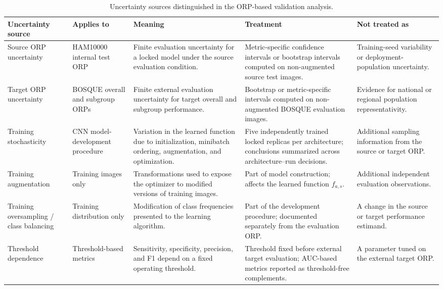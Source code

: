 \begin{table}[h!]
\centering
\scriptsize
\caption{Uncertainty sources distinguished in the ORP-based validation analysis.}
\label{tab:uncertainty-sources}
\setlength{\tabcolsep}{4pt}
\renewcommand{\arraystretch}{1.08}
\begin{tabular}{p{3.0cm}p{3.0cm}p{4.2cm}p{4.2cm}p{3.7cm}}
\toprule
\textbf{Uncertainty source} & \textbf{Applies to} & \textbf{Meaning} & \textbf{Treatment} & \textbf{Not treated as} \\
\midrule
Source ORP uncertainty & HAM10000 internal test ORP & Finite evaluation uncertainty for a locked model under the source evaluation condition. & Metric-specific confidence intervals or bootstrap intervals computed on non-augmented source test images. & Training-seed variability or deployment-population uncertainty. \\
\addlinespace
Target ORP uncertainty & BOSQUE overall and subgroup ORPs & Finite external evaluation uncertainty for target overall and subgroup performance. & Bootstrap or metric-specific intervals computed on non-augmented BOSQUE evaluation images. & Evidence for national or regional population representativity. \\
\addlinespace
Training stochasticity & CNN model-development procedure & Variation in the learned function due to initialization, minibatch ordering, augmentation, and optimization. & Five independently trained locked replicas per architecture; conclusions summarized across architecture--run decisions. & Additional sampling information from the source or target ORP. \\
\addlinespace
Training augmentation & Training images only & Transformations used to expose the optimizer to modified versions of training images. & Part of model construction; affects the learned function $f_{a,s}$. & Additional independent evaluation observations. \\
\addlinespace
Training oversampling / class balancing & Training distribution only & Modification of class frequencies presented to the learning algorithm. & Part of the development procedure; documented separately from the evaluation ORP. & A change in the source or target performance estimand. \\
\addlinespace
Threshold dependence & Threshold-based metrics & Sensitivity, specificity, precision, and F1 depend on a fixed operating threshold. & Threshold fixed before external target evaluation; AUC-based metrics reported as threshold-free complements. & A parameter tuned on the external target ORP. \\

\end{tabular}
\end{table}
